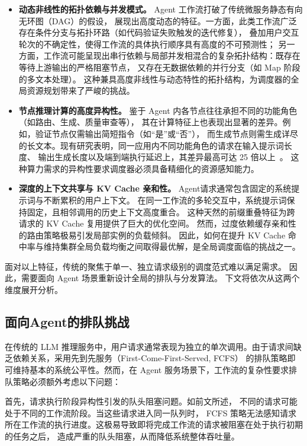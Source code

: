 \begin{itemize}
  \item \textbf{动态非线性的拓扑依赖与并发模式。} Agent 工作流打破了传统微服务静态有向无环图（DAG）的假设，
      展现出高度动态的特征。一方面，此类工作流广泛存在条件分支与拓扑环路（如代码验证失败触发的迭代修复），
      叠加用户交互轮次的不确定性，使得工作流的具体执行顺序具有高度的不可预测性；
      另一方面，工作流可能呈现出串行依赖与局部并发相混合的复杂拓扑结构：既存在等待上游输出的严格阻塞节点，
      又存在无数据依赖的并行分支（如 Map 阶段的多文本处理）。
      这种兼具高度非线性与动态特性的拓扑结构，为调度器的全局资源规划带来了严峻的挑战。
  
  \item \textbf{节点推理计算的高度异构性。} 鉴于 Agent 内各节点往往承担不同的功能角色（如路由、生成、质量审查等），
      其在计算特征上也表现出显著的差异。例如，验证节点仅需输出简短指令（如“是”或“否”），
      而生成节点则需生成详尽的长文本。现有研究表明，同一应用内不同功能角色的请求在输入提示词长度、
      输出生成长度以及端到端执行延迟上，其差异最高可达 25 倍以上~\cite{chen2025kairos}。
      这种算力需求的异构性要求调度器必须具备精细化的资源感知能力。
  
  \item \textbf{深度的上下文共享与 KV Cache 亲和性。} Agent请求通常包含固定的系统提示词与不断累积的用户上下文。
      在同一工作流的多轮交互中，系统提示词保持固定，且相邻调用的历史上下文高度重合。
      这种天然的前缀重叠特征为跨请求的 KV Cache 复用提供了巨大的优化空间。
      然而，过度依赖缓存亲和性的路由策略极易引发局部实例的负载倾斜。
      因此，如何在提升 KV Cache 命中率与维持集群全局负载均衡之间取得最优解，是全局调度面临的挑战之一。
\end{itemize}
面对以上特征，传统的聚焦于单一、独立请求级别的调度范式难以满足需求。
因此，需要面向 Agent 场景重新设计全局的排队与分发算法。
下文将依次从这两个维度展开分析。

\subsection{面向Agent的排队挑战}
在传统的 LLM 推理服务中，用户请求通常表现为独立的单次调用。由于请求间缺乏依赖关系，采用先到先服务（First-Come-First-Served, FCFS）
的排队策略即可维持基本的系统公平性。然而，在 Agent 服务场景下，工作流的复杂性要求排队策略必须额外考虑以下问题：

首先，请求执行阶段异构性引发的队头阻塞问题。如前文所述，
不同的请求可能处于不同的工作流阶段。当这些请求进入同一队列时，
FCFS 策略无法感知请求所在工作流的执行进度。这极易导致即将完成工作流的请求被阻塞在处于执行初期的任务之后，
造成严重的队头阻塞，从而降低系统整体吞吐量。

